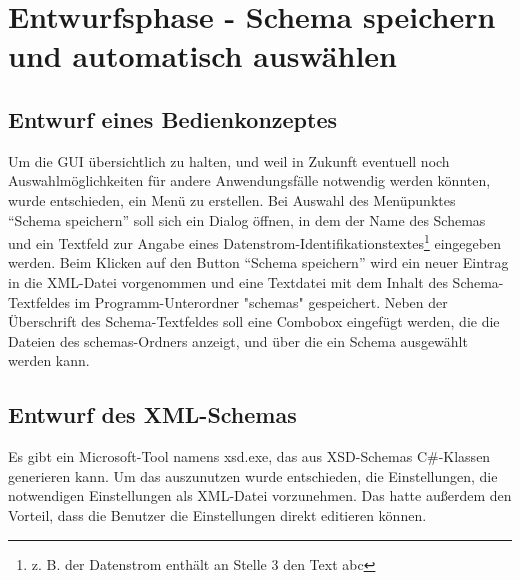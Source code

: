 
\section{Entwurfsphase - Schema speichern und automatisch auswählen} 
\label{sec:Entwurfsphase1}


\subsection{Entwurf eines Bedienkonzeptes}
\label{sec:EntwurfBedienkonzept123}
Um die GUI übersichtlich zu halten, und weil in Zukunft eventuell noch Auswahlmöglichkeiten für andere Anwendungsfälle notwendig werden könnten, wurde entschieden, ein Menü zu erstellen. Bei Auswahl des Menüpunktes ``Schema speichern'' soll sich ein Dialog öffnen, in dem der Name des Schemas und ein Textfeld zur Angabe eines Datenstrom-Identifikationstextes\footnote{z. B. der Datenstrom enthält an Stelle 3 den Text abc} eingegeben werden. Beim Klicken auf den Button ``Schema speichern'' wird ein neuer Eintrag in die XML-Datei vorgenommen und eine Textdatei mit dem Inhalt des Schema-Textfeldes im Programm-Unterordner "schemas" gespeichert.
Neben der Überschrift des Schema-Textfeldes soll eine Combobox eingefügt werden, die die Dateien des schemas-Ordners anzeigt, und über die ein Schema ausgewählt werden kann.

\subsection{Entwurf des XML-Schemas}
\label{sec:EntwurfXMLSCHEMA}
Es gibt ein Microsoft-Tool namens xsd.exe, das aus XSD-Schemas C\#-Klassen generieren kann. Um das auszunutzen wurde entschieden, die Einstellungen, die notwendigen Einstellungen als XML-Datei vorzunehmen. Das hatte außerdem den Vorteil, dass die Benutzer die Einstellungen direkt editieren können.

